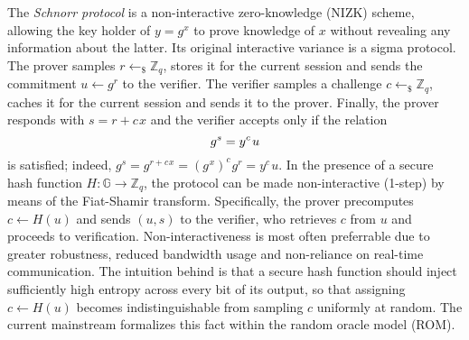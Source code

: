 \documentclass{iacrtrans}
\begin{document}
The \textit{Schnorr protocol}
is a non-interactive zero-knowledge (NIZK) scheme,
allowing the key holder of $y = g ^ x$
to prove knowledge of $x$
without revealing any information about the latter.
Its original interactive variance \cite{paper_schnorr} is a sigma protocol.
The prover samples $r \leftarrow_\$ \mathbb{Z}_q$,
stores it for the current session
and sends the commitment $u \leftarrow g ^ r$ to the verifier.
The verifier samples a challenge $c \leftarrow_\$ \mathbb{Z}_q$,
caches it for the current session and sends it to the prover.
Finally, the prover responds with $s = r + c\hspace{1pt}x$
and the verifier accepts only if the relation
\vspace{5pt}
\begin{equation*}
g ^ s = y ^ c\hspace{1pt}u
\vspace{5pt}
\end{equation*}
is satisfied; indeed,
$g^s=g^{r + c\hspace{1pt}x}
=(g^{\hspace{1pt}x})^c\hspace{1pt}g^r
=y^c\hspace{1pt}u$.
In the presence of a secure hash function
$H: \mathbb{G} \rightarrow \mathbb{Z}_q$,
the protocol can be made non-interactive (1-step)
by means of the Fiat-Shamir transform. Specifically,
the prover precomputes $c \leftarrow H(u)$
and sends $(u, s)$ to the verifier,
who retrieves $c$ from $u$ and proceeds
to verification.
Non-interactiveness is most often preferrable
due to greater robustness, reduced bandwidth usage
and non-reliance on real-time communication.
The intuition behind is that a secure hash function
should inject sufficiently high entropy
across every bit of its output,
so that assigning $c \leftarrow H(u)$
becomes indistinguishable from sampling $c$ uniformly at random.
The current mainstream formalizes this fact
within the random oracle model (ROM).
\end{document}
